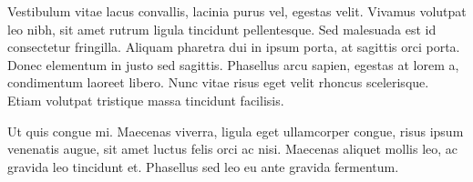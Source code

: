 Vestibulum vitae lacus convallis, lacinia purus vel, egestas velit. Vivamus volutpat leo nibh, sit amet rutrum ligula tincidunt pellentesque. Sed malesuada est id consectetur fringilla. Aliquam pharetra dui in ipsum porta, at sagittis orci porta. Donec elementum in justo sed sagittis. Phasellus arcu sapien, egestas at lorem a, condimentum laoreet libero. Nunc vitae risus eget velit rhoncus scelerisque. Etiam volutpat tristique massa tincidunt facilisis.

Ut quis congue mi. Maecenas viverra, ligula eget ullamcorper congue, risus ipsum venenatis augue, sit amet luctus felis orci ac nisi. Maecenas aliquet mollis leo, ac gravida leo tincidunt et. Phasellus sed leo eu ante gravida fermentum. 

\newpage